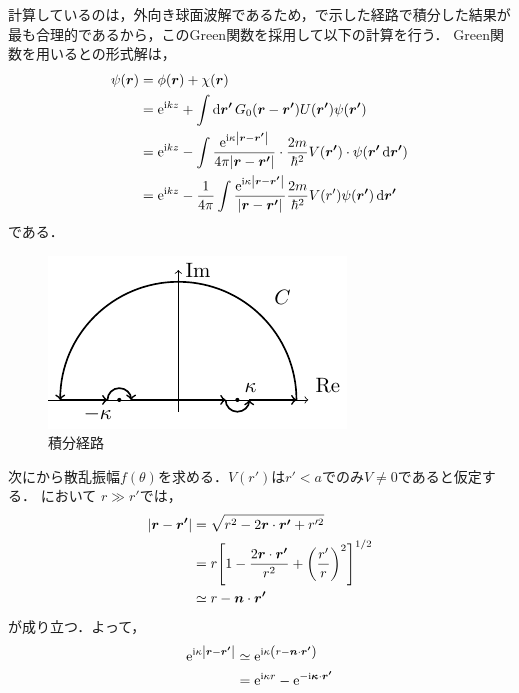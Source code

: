 \documentclass{report}
\begin{document}
    計算しているのは，外向き球面波解であるため，で示した経路で積分した結果が最も合理的であるから，このGreen関数を採用して以下の計算を行う．
    Green関数を用いるとの形式解は，
    \begin{align}
      \psi(\bm{r}) &= \phi(\bm{r}) + \chi(\bm{r}) \\ 
      &= \mathrm{e}^{\mathrm{i} kz} + \int\dd{\bm{r'}} G_0(\bm{r} - \bm{r'}) U(\bm{r'}) \psi(\bm{r'}) \\ 
      &= \mathrm{e}^{\mathrm{i} kz} - \int \frac{\mathrm{e}^{\mathrm{i}\kappa \abs{\bm{r} - \bm{r'}}}}{4\pi \abs{\bm{r} - \bm{r'}}} \cdot \frac{2m}{\hbar^2} V(\bm{r'}) \cdot \psi(\bm{r'}\dd{\bm{r'}}) \\ 
      &= \mathrm{e}^{\mathrm{i} kz} - \frac{1}{4\pi} \int \frac{\mathrm{e}^{\mathrm{i} \kappa \abs{\bm{r} - \bm{r'}}}}{\abs{\bm{r} - \bm{r'}}} \frac{2m}{\hbar^2}V(r')\psi(\bm{r'}) \dd{\bm{r'}}\label{formal-soultion}
    \end{align}
    である．
    \begin{figure}[H]
      \centering
      \includegraphics[width = 0.5\columnwidth]{fig/integral-green-tex.pdf}
      \caption{積分経路}\label{Integral}
    \end{figure}
    \par
    次にから散乱振幅$f(\theta)$を求める．$V(r')$は$r' < a$でのみ$V\neq 0$であると仮定する．
    において
    $r \gg r'$では，
    \begin{align}
      \abs{\bm{r} - \bm{r'}} &= \sqrt{r^2 - 2\bm{r} \cdot \bm{r'} + r'^2} \\
      &= r \qty[1 - \frac{2\bm{r}\cdot\bm{r'}}{r^2} + \qty(\frac{r'}{r})^2]^{1/2} \\
      &\simeq r - \bm{n}\cdot\bm{r'}\label{abs-r-r-prime-approx}
    \end{align}
    が成り立つ．よって，
    \begin{align}
      \mathrm{e}^{\mathrm{i} \kappa \abs{\bm{r} - \bm{r'}}} &\simeq \mathrm{e}^{\mathrm{i} \kappa \qty(r - \bm{n} \cdot \bm{r'})}\\
      &= \mathrm{e}^{\mathrm{i} \kappa r} - \mathrm{e}^{-\mathrm{i} \bm{\kappa} \cdot \bm{r'}}\label{exp-abs-r-r-prime-approx}
    \end{align}
\end{document}

